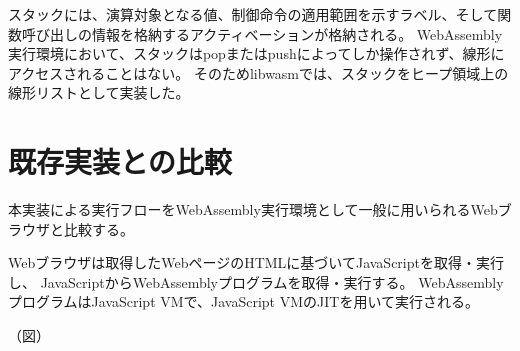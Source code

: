 スタックには、演算対象となる値、制御命令の適用範囲を示すラベル、そして関数呼び出しの情報を格納するアクティベーションが格納される。
WebAssembly実行環境において、スタックはpopまたはpushによってしか操作されず、線形にアクセスされることはない。
そのためlibwasmでは、スタックをヒープ領域上の線形リストとして実装した。

\section{既存実装との比較}

本実装による実行フローをWebAssembly実行環境として一般に用いられるWebブラウザと比較する。

Webブラウザは取得したWebページのHTMLに基づいてJavaScriptを取得・実行し、
JavaScriptからWebAssemblyプログラムを取得・実行する。
WebAssemblyプログラムはJavaScript VMで、JavaScript VMのJITを用いて実行される。

（図）
